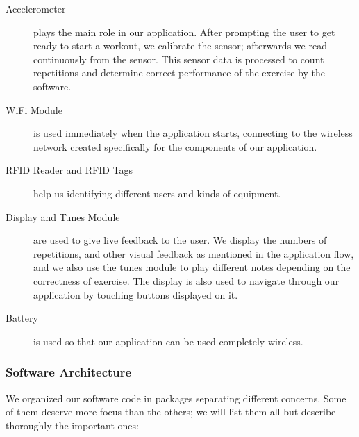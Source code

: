 \documentclass{tk3-team}
\begin{document}
\begin{description}
\item[Accelerometer] plays the main role in our application. After prompting the user to get ready to start a workout, we calibrate the sensor; afterwards we read continuously from the sensor. This sensor data is processed to count repetitions and determine correct performance of the exercise by the software.
\item[WiFi Module] is used immediately when the application starts, connecting to the wireless network created specifically for the components of our application. 
\item[RFID Reader and RFID Tags] help us identifying different users and kinds of equipment.
\item[Display and Tunes Module] are used to give live feedback to the user. We display the numbers of repetitions, and other visual feedback as mentioned in the application flow, and we also use the tunes module to play different notes depending on the correctness of exercise. The display is also used to navigate through our application by touching buttons displayed on it.
\item[Battery] is used so that our application can be used completely wireless.
\end{description}

\subsubsection{Software Architecture}

We organized our software code in packages separating different concerns. Some of them deserve more focus than the others; we will list them all but describe thoroughly the important ones:
\end{document}
